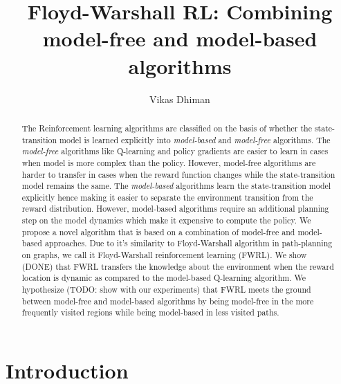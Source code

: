 \documentclass[letterpaper]{article} %
\begin{document}
%
\title{Floyd-Warshall RL: Combining model-free and model-based algorithms}
\author{Vikas Dhiman}
\maketitle
\begin{abstract}
The Reinforcement learning algorithms are classified on the basis of whether
the state-transition model is learned explicitly into \emph{model-based}
and \emph{model-free} algorithms.
%
The \emph{model-free} algorithms like Q-learning and policy gradients are easier to learn in cases when model is more complex than the policy.
However, model-free algorithms are harder to transfer in cases when the reward function changes while the state-transition model remains the same.
The \emph{model-based} algorithms learn the state-transition model explicitly hence making it
easier to separate the environment transition from the reward distribution.
However, model-based algorithms require an additional planning step on the model dynamics
which make it expensive to compute the policy.
%
We propose a novel algorithm that is based on a combination of model-free and model-based approaches.
Due to it's similarity to Floyd-Warshall algorithm in path-planning on graphs, we call
it Floyd-Warshall reinforcement learning (FWRL).
We show (DONE) that FWRL transfers the knowledge about the environment when the reward location is dynamic as compared to the model-based Q-learning algorithm.
We hypothesize (TODO: show with our experiments) that FWRL meets the ground between model-free and model-based algorithms by being model-free in the more frequently visited regions while being model-based in less visited paths.
\end{abstract}


\section{ Introduction}
\end{document}
